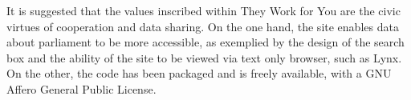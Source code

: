 It is suggested that the values inscribed within They Work for You are the civic virtues of cooperation and data sharing.
On the one hand, the site enables data about parliament to be more accessible, as exemplied by the design of the search box and the ability of the site to be viewed via text only browser, such as Lynx. 
On the other, the code has been packaged and is freely available, with a GNU Affero General Public License. 
